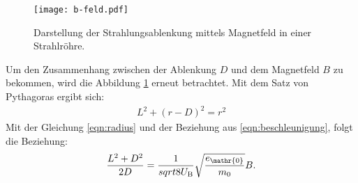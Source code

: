 \begin{figure}
 \centering
 \texttt{[image: b-feld.pdf]}
 \caption{Darstellung der Strahlungsablenkung mittels Magnetfeld in einer Strahlröhre.}
 \label{fig:kreis}
\end{figure}

Um den Zusammenhang zwischen der Ablenkung $D$ und dem Magnetfeld $B$ zu bekommen, wird die Abbildung \ref{fig:kreis} erneut betrachtet.
Mit dem Satz von Pythagoras ergibt sich:
\begin{align}
  L^2+(r-D)^2=r^2
\end{align}
Mit der Gleichung \eqref{eqn:radius} und der Beziehung aus \eqref{eqn:beschleunigung}, folgt die Beziehung:
\begin{align}
  \frac{L^2+D^2}{2D}=\frac{1}{sqrt{8U_\mathrm{B}}}\sqrt{\frac{e_\mathr{0}}{m_\mathrm{0}}}B.
\end{align}
